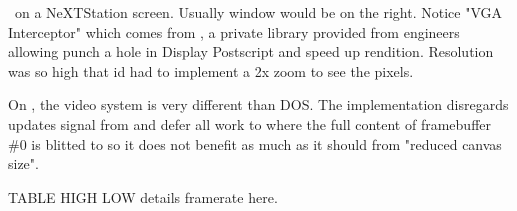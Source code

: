 \doom~on a NeXTStation screen. Usually  window would be on the right. Notice "VGA Interceptor" which comes from , a private library provided from \NeXT engineers allowing punch a hole in Display Postscript and speed up rendition. Resolution was so high that id had to implement a 2x zoom to see the pixels.\\
\par
{}


On \NeXT, the video system is very different than DOS. The implementation disregards updates signal from  and defer all work to  where the full content of framebuffer \#0 is blitted to  so it does not benefit as much as it should from "reduced canvas size".\\
\par
TABLE HIGH LOW details framerate here.
